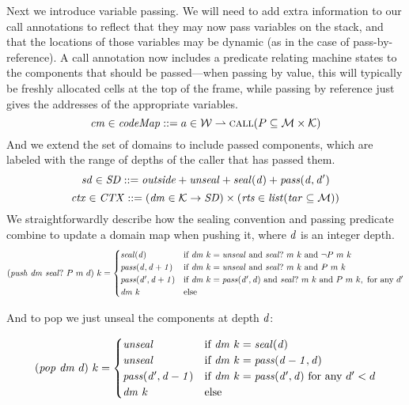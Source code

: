 \documentclass[acmsmall,review,anonymous]{acmart}\settopmatter{printfolios=true,printccs=false,printacmref=false}
\begin{document}
Next we introduce variable passing. We will need to add extra information to our call
annotations to reflect that they may now pass variables on the stack, and that the locations
of those variables may be dynamic (as in the case of pass-by-reference).
A call annotation now includes a predicate relating machine states to the components
that should be passed---when passing by value, this will typically be freshly allocated
cells at the top of the frame, while passing by reference just gives the
addresses of the appropriate variables.
\[\mathit{cm} \in \mathit{codeMap} ::= a \in {\mathcal W} \rightharpoonup \text{\sc call}(P \subseteq {\mathcal M} \times {\mathcal K})\]
And we extend the set of domains to include passed components,
which are labeled with the range of depths of the caller that has passed them.
\[\mathit{sd} \in \mathit{SD} ::= \mathit{outside} + \mathit{unseal} + \mathit{seal(d)} + \mathit{pass(d,d')}\]
\[\mathit{ctx} \in \mathit{CTX} ::= (\mathit{dm} \in {\mathcal K} \rightarrow \mathit{SD})
\times (\mathit{rts} \in \mathit{list} (\mathit{tar} \subseteq {\mathcal M})) \]
We straightforwardly describe how the sealing convention and passing predicate combine to
update a domain map when pushing it, where \(d\) is an integer depth.
\[(\mathit{push} ~ \mathit{dm} ~ \mathit{seal?} ~ P ~ m ~ d) ~ k =
\begin{cases}
  \mathit{seal(d)}              & \text{if } \mathit{dm} ~ k = \mathit{unseal} \text{ and }
                                 \mathit{seal?} ~ m ~ k \text{ and } \neg P ~ m ~ k \\
  \mathit{pass(d,d+1)}     & \text{if } \mathit{dm} ~ k = \mathit{unseal} \text{ and }
                                 \mathit{seal?} ~ m ~ k \text{ and } P ~ m ~ k \\
  \mathit{pass(d',d+1)}    & \text{if } \mathit{dm} ~ k = \mathit{pass(d',d)} \text{ and }
                                 \mathit{seal?} ~ m ~ k \text{ and } P ~ m ~ k,
                                 \text{ for any } d' \\
  \mathit{dm}~k & \text{else} \\
\end{cases}\]

And to pop we just unseal the components at depth \(d\):

\[(\mathit{pop} ~ \mathit{dm} ~ d) ~ k =
\begin{cases}
  \mathit{unseal}                 & \text{if } \mathit{dm} ~ k = \mathit{seal(d)} \\
  \mathit{unseal}                 & \text{if } \mathit{dm} ~ k = \mathit{pass(d-1,d)} \\
  \mathit{pass(d',d-1)} & \text{if } \mathit{dm} ~ k = \mathit{pass(d',d)}
                              \text{ for any } d' < d \\
  \mathit{dm}~k        & \text{else} \\
\end{cases}\]
\end{document}
